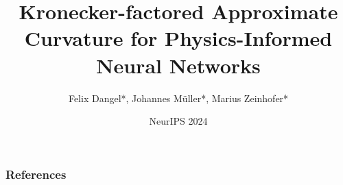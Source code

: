 \documentclass[12pt,usepdftitle=false,aspectratio=169]{beamer}
\title{%
  Kronecker-factored Approximate Curvature for Physics-Informed Neural Networks
}
\author{Felix Dangel*, Johannes M\"uller*, Marius Zeinhofer*}
\date{NeurIPS 2024}
\begin{document}
\makeTitleSlide





\begin{frame}[allowframebreaks]
  \frametitle{References}

  {\footnotesize
    
    
  }
\end{frame}
\end{document}
